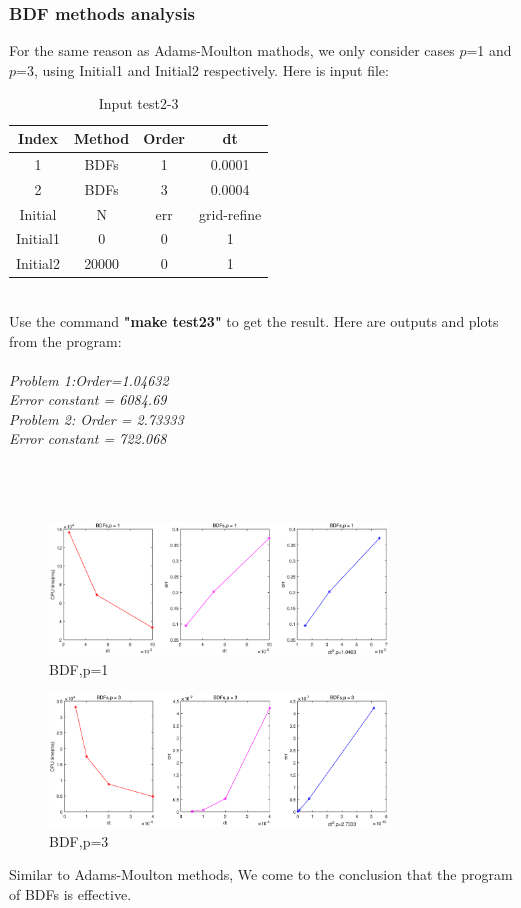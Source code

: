 \documentclass[a4paper,twocolumn]{article}
\theoremstyle{definition}
\begin{document}
\subsubsection{BDF methods analysis}
For the same reason as Adams-Moulton mathods, we only consider cases $p$=1 and $p$=3, using Initial1 and Initial2  respectively. Here is input file:
\begin{table}[!htp]
	\centering
	\begin{tabular}{|c|c|c|c|}
		\hline	
		Index & Method & Order & dt \\
		\hline		
		1 & BDFs & 1 & 0.0001   \\	
		\hline		
		2 & BDFs & 3 & 0.0004   \\	
		\hline \hline
		Initial & N & err & grid-refine \\
		\hline
		Initial1 & 0 & 0 & 1 \\
		\hline
		Initial2 & 20000 & 0 & 1 \\
		\hline
	\end{tabular}
	\caption{Input test2-3}
	\label{tab:test23}
\end{table}\\
Use the command \textbf{"make test23"} to get the result. Here are outputs and plots from the program:\\\\
\emph{Problem 1:Order=1.04632}\\
\emph{Error constant = 6084.69}\\
\emph{Problem 2: Order = 2.73333}\\
\emph{Error constant = 722.068}\\\\\\\\
\begin{figure}[!htp]   
	\centering
	\includegraphics[width=9cm]{Pictures/2_3_1.eps}
	\caption{BDF,p=1}
	\label{fig:BDF1gf}
\end{figure}
\newpage
\begin{figure}[!htp]   
	\centering
	\includegraphics[width=9cm]{Pictures/2_3_2.eps}
	\caption{BDF,p=3}
	\label{fig:BDF3gf}
\end{figure}
\noindent Similar to Adams-Moulton methods, We come to the conclusion that the program of BDFs is effective. 
\end{document}
